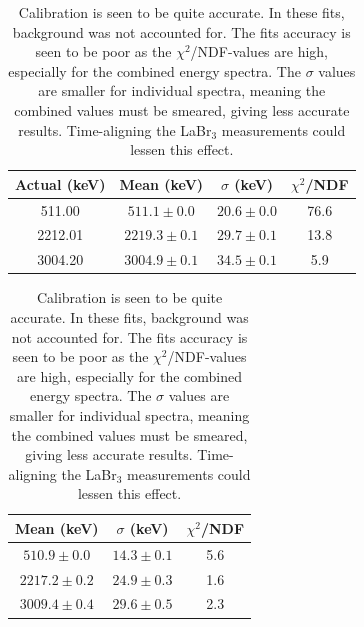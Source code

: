\documentclass[a4paper,11pt]{article}
\begin{document}
\begin{table}[htbp]
    \centering
    \begin{minipage}{0.50\textwidth}
        \caption{ Gaussian fit results for combined spectra}
        \centering
        \begin{tabular}{ c | c  c  |c }
        \toprule
        {Actual (keV)} & {Mean (keV)} & {$\sigma$ (keV)} & {$\chi^2$/NDF} \\
        \midrule
       511.00  & $511.1 \pm 0.0$ & $20.6 \pm 0.0$ & 76.6 \\
       2212.01 & $2219.3 \pm 0.1$ & $29.7 \pm 0.1$ & 13.8 \\
       3004.20 & $3004.9 \pm 0.1$ & $34.5 \pm 0.1$ & 5.9 \\
        \bottomrule
        \end{tabular}
        \label{tab:27Al-combined-fits}
    \end{minipage}%
    \hfill\hfill
    \begin{minipage}{0.45\textwidth}
        \centering
        \caption{ Gaussian fit results for detector 1}
        \begin{tabular}{  c  |c c}
            \toprule
            {Mean (keV)} & {$\sigma$ (keV)} & {$\chi^2$/NDF} \\
            \midrule
           $510.9 \pm 0.0$ & $14.3 \pm 0.1$ & 5.6 \\
           $2217.2 \pm 0.2$ & $24.9 \pm 0.3$ & 1.6 \\
           $3009.4 \pm 0.4$ & $29.6 \pm 0.5$ & 2.3 \\
            \bottomrule
        \end{tabular}
        \label{tab:27Al-det1-fits}
        \end{minipage}
        \caption{Calibration is seen to be quite accurate. In these fits, background was not accounted for. The fits accuracy is seen to be poor as  the $\chi^2$/NDF-values are high, especially for the combined energy spectra. The $\sigma$ values are smaller for individual spectra, meaning the combined values must be smeared, giving less accurate results. Time-aligning the LaBr$_3$ measurements could lessen this effect.}
\end{table}
\end{document}
